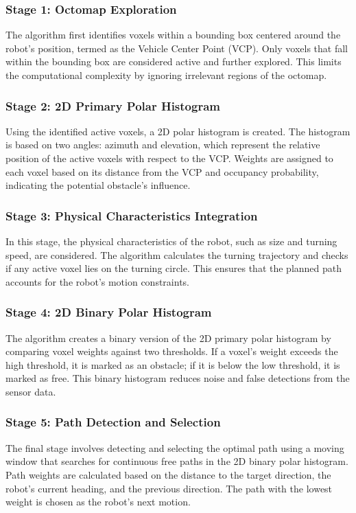 \documentclass[a4paper,12pt]{article}
\begin{document}
    \subsubsection{Stage 1: Octomap Exploration}
    The algorithm first identifies voxels within a bounding box centered around the robot's position, termed as the Vehicle Center Point (VCP). Only voxels that fall within the bounding box are considered active and further explored. This limits the computational complexity by ignoring irrelevant regions of the octomap.
    
    \subsubsection{Stage 2: 2D Primary Polar Histogram}
    Using the identified active voxels, a 2D polar histogram is created. The histogram is based on two angles: azimuth and elevation, which represent the relative position of the active voxels with respect to the VCP. Weights are assigned to each voxel based on its distance from the VCP and occupancy probability, indicating the potential obstacle's influence.
    
    \subsubsection{Stage 3: Physical Characteristics Integration}
    In this stage, the physical characteristics of the robot, such as size and turning speed, are considered. The algorithm calculates the turning trajectory and checks if any active voxel lies on the turning circle. This ensures that the planned path accounts for the robot's motion constraints.
    
    \subsubsection{Stage 4: 2D Binary Polar Histogram}
    The algorithm creates a binary version of the 2D primary polar histogram by comparing voxel weights against two thresholds. If a voxel’s weight exceeds the high threshold, it is marked as an obstacle; if it is below the low threshold, it is marked as free. This binary histogram reduces noise and false detections from the sensor data.
    
    \subsubsection{Stage 5: Path Detection and Selection}
    The final stage involves detecting and selecting the optimal path using a moving window that searches for continuous free paths in the 2D binary polar histogram. Path weights are calculated based on the distance to the target direction, the robot’s current heading, and the previous direction. The path with the lowest weight is chosen as the robot's next motion.
    
\end{document}
